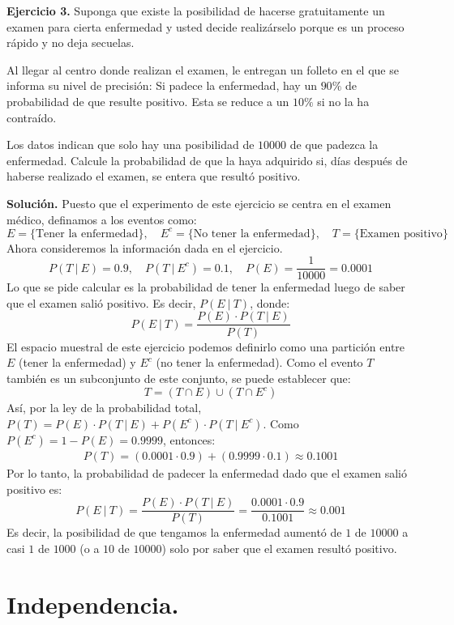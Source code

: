 \documentclass[12pt]{article}
\begin{document}
\textbf{Ejercicio 3.} Suponga que existe la posibilidad de hacerse gratuitamente un examen para cierta enfermedad y usted decide realizárselo porque es un proceso rápido y no deja secuelas.

Al llegar al centro donde realizan el examen, le entregan un folleto en el que se informa su nivel de precisión: Si padece la enfermedad, hay un $90\%$ de probabilidad de que resulte positivo. Esta se reduce a un $10\%$ si no la ha contraído.

Los datos indican que solo hay una posibilidad de $10000$ de que padezca la enfermedad. Calcule la probabilidad de que la haya adquirido si, días después de haberse realizado el examen, se entera que resultó positivo.

\textbf{Solución.} Puesto que el experimento de este ejercicio se centra en el examen médico, definamos a los eventos como:
\[
      E = \{\text{Tener la enfermedad}\}, \quad
  E^{c} = \{\text{No tener la enfermedad}\}, \quad
      T = \{\text{Examen positivo}\}
\]
Ahora consideremos la información dada en el ejercicio.
\[
  P(T \ | \ E) = 0.9, \quad P(T \ | \ E^{c}) = 0.1, \quad P(E) = \frac{1}{10000} = 0.0001
\]
Lo que se pide calcular es la probabilidad de tener la enfermedad luego de saber que el examen salió positivo. Es decir, $P(E \ | \ T)$, donde:
\[
  P(E \ | \ T) = \frac{P(E) \cdot P(T \ | \ E)}{P(T)}
\]
El espacio muestral de este ejercicio podemos definirlo como una partición entre $E$ (tener la enfermedad) y $E^{c}$ (no tener la enfermedad). Como el evento $T$ también es un subconjunto de este conjunto, se puede establecer que:
\[
  T = (T \cap E) \cup (T \cap E^{c})
\]
Así, por la ley de la probabilidad total, $P(T) = P(E) \cdot P(T \ | \ E) + P(E^{c}) \cdot P(T \ | \ E^{c})$. Como $P(E^{c}) = 1 - P(E) = 0.9999$, entonces:
\begin{align*}
  P(T) = (0.0001 \cdot 0.9) + (0.9999 \cdot 0.1) \approx 0.1001
\end{align*}
Por lo tanto, la probabilidad de padecer la enfermedad dado que el examen salió positivo es:
\[
  P(E \ | \ T) = \frac{P(E) \cdot P(T \ | \ E)}{P(T)}
               = \frac{0.0001 \cdot 0.9}{0.1001}
               \approx 0.001
\]
Es decir, la posibilidad de que tengamos la enfermedad aumentó de $1$ de $10000$ a casi $1$ de $1000$ (o a $10$ de $10000$) solo por saber que el examen resultó positivo.

\section{Independencia.}
\end{document}
